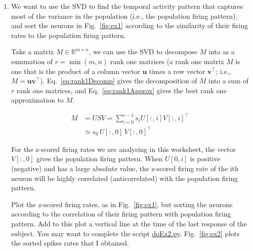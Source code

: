 \documentclass[12pt]{article}
\begin{document}
\begin{enumerate}
        \item We want to use the SVD to find the temporal activity pattern that
            captures most of the variance in the population (i.e., the
            population firing pattern), and sort the neurons in
            Fig.~\ref{fig:ex1} according to the similarity of their firing
            rates to the population firing pattern.

            Take a matrix $M\in\mathbb{R}^{m\times n}$, we can use
            the SVD to decompose $M$ into as a summation of $r=\min(m, n)$
            rank one matrices (a rank one matrix $M$ is one that is the
            product of a column vector $\mathbf{u}$ times a row vector
            $\mathbf{v}^\intercal$; i.e.,
            $M=\mathbf{u}\mathbf{v}^\intercal$). Eq.~\ref{eq:rank1Decomp}
            gives the decomposition of $M$ into a sum of $r$ rank one
            matrices, and Eq.~\ref{eq:rank1Approx} gives the best rank one
            approximation to $M$.

            \begin{align}
                M&=USV=\sum_{i=0}^{r-1}s_iU[:,i]V[:,i]^\intercal\label{eq:rank1Decomp}\\
                &\simeq s_0\,U[:,0]\,V[:,0]^\intercal\label{eq:rank1Approx}
            \end{align}

            For the z-scored firing rates we are analysing in this worksheet,
            the vector $V[:,0]$ gives the population firing pattern. When
            $U[0,i]$ is positive (negative) and has a large absolute value, the
            z-scored firing rate of the ith neuron will be highly correlated
            (anticorrelated) with the population firing pattern.

            Plot the z-scored firing rates, as in Fig.~\ref{fig:ex1}, but
            sorting the neurons according to the correlation of their firing
            pattern with population firing pattern.
            Add to this plot a vertical line at the time of the last response
            of the subject.
            You may want to complete
            the script
            \href{https://github.com/joacorapela/statNeuro2025/blob/master/worksheets/04_dimensionalityReduction/doEx2.py}{doEx2.py}.
            Fig.~\ref{fig:ex2} plots the sorted spikes rates
            that I obtained.


\end{enumerate}
\end{document}
